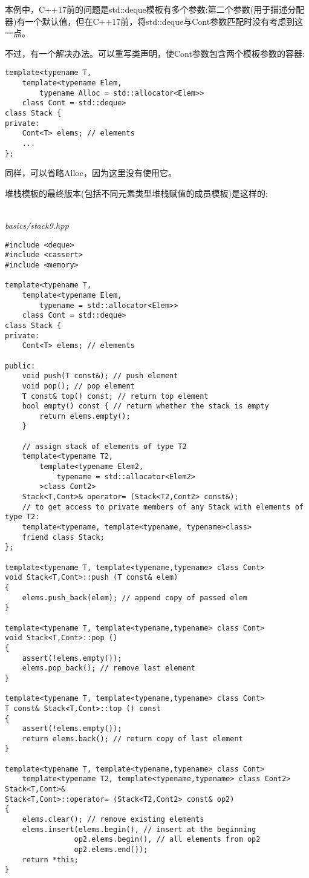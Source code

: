 本例中，C++17前的问题是std::deque模板有多个参数:第二个参数(用于描述分配器)有一个默认值，但在C++17前，将std::deque与Cont参数匹配时没有考虑到这一点。

不过，有一个解决办法。可以重写类声明，使Cont参数包含两个模板参数的容器:

\begin{lstlisting}[style=styleCXX]
template<typename T,
	template<typename Elem,
		typename Alloc = std::allocator<Elem>>
	class Cont = std::deque>
class Stack {
private:
	Cont<T> elems; // elements
	...
};
\end{lstlisting}

同样，可以省略Alloc，因为这里没有使用它。

堆栈模板的最终版本(包括不同元素类型堆栈赋值的成员模板)是这样的:

\hspace*{\fill} \\ %
\noindent
\textit{basics/stack9.hpp}
\begin{lstlisting}[style=styleCXX]
#include <deque>
#include <cassert>
#include <memory>

template<typename T,
	template<typename Elem,
		typename = std::allocator<Elem>>
	class Cont = std::deque>
class Stack {
private:
	Cont<T> elems; // elements
	
public:
	void push(T const&); // push element
	void pop(); // pop element
	T const& top() const; // return top element
	bool empty() const { // return whether the stack is empty
		return elems.empty();
	}

	// assign stack of elements of type T2
	template<typename T2,
		template<typename Elem2,
			typename = std::allocator<Elem2>
		>class Cont2>
	Stack<T,Cont>& operator= (Stack<T2,Cont2> const&);
	// to get access to private members of any Stack with elements of type T2:
	template<typename, template<typename, typename>class>
	friend class Stack;
};

template<typename T, template<typename,typename> class Cont>
void Stack<T,Cont>::push (T const& elem)
{
	elems.push_back(elem); // append copy of passed elem
}

template<typename T, template<typename,typename> class Cont>
void Stack<T,Cont>::pop ()
{
	assert(!elems.empty());
	elems.pop_back(); // remove last element
}

template<typename T, template<typename,typename> class Cont>
T const& Stack<T,Cont>::top () const
{
	assert(!elems.empty());
	return elems.back(); // return copy of last element
}

template<typename T, template<typename,typename> class Cont>
	template<typename T2, template<typename,typename> class Cont2>
Stack<T,Cont>&
Stack<T,Cont>::operator= (Stack<T2,Cont2> const& op2)
{
	elems.clear(); // remove existing elements
	elems.insert(elems.begin(), // insert at the beginning
				op2.elems.begin(), // all elements from op2
				op2.elems.end());
	return *this;
}
\end{lstlisting}

